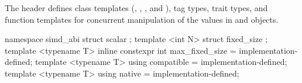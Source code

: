 

\pnum
The header  defines class templates (\simd, \mask, , and ), tag types, trait types, and function templates for concurrent manipulation of the values in \simd and \mask objects.


\begin{itemdecl}
namespace simd_abi {
  struct scalar {};
  template <int N> struct fixed_size {};
  template <typename T> inline constexpr int max_fixed_size = implementation-defined;
  template <typename T> using compatible = implementation-defined;
  template <typename T> using native = implementation-defined;
}
\end{itemdecl}
